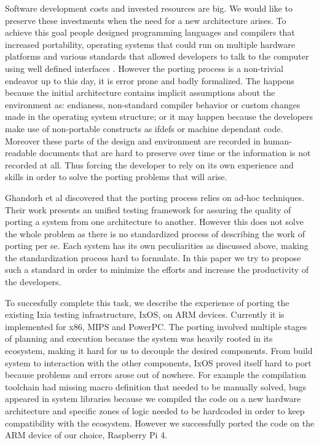 \documentclass[12pt,a4paper]{report}
\begin{document}
Software development costs and invested resources are big. We would like to preserve these
investments when the need for a new architecture arises. To achieve this goal people designed
programming languages and compilers that increased portability, operating systems that could run
on multiple hardware platforms \cite{johnson1978unix} and various standards that allowed developers
to talk to the computer using well defined interfaces \cite{walli1995posix}. However the porting
process is a non-trivial endeavor up to this day, it is error prone and badly formalized. The
happens because the initial architecture contains implicit assumptions about the environment as:
endianess, non-standard compiler behavior or custom changes made in the operating system structure;
or it may happen because the developers make use of non-portable constructs as ifdefs
\cite{spencer1992ifdef} or machine dependant code. Moreover these parts of the design and
environment are recorded in human-readable documents that are hard to preserve over time or the
information is not recorded at all. Thus forcing the developer to rely on its own experience and
skills in order to solve the porting problems that will arise.

Ghandorh et al \cite{ghandorh2020systematic} discovered that the porting process relies on ad-hoc
techniques. Their work presents an unified testing framework for assuring the quality of porting
a system from one architecture to another. However this does not solve the whole problem as there
is no standardized process of describing the work of porting per se. Each system has its own
peculiarities as discussed above, making the standardization process hard to formulate. In this
paper we try to propose such a standard in order to minimize the efforts and increase the
productivity of the developers.

To succesfully complete this task, we describe the experience of porting the existing Ixia testing
infrastructure, IxOS, on ARM devices. Currently it is implemented for x86, MIPS and PowerPC. The
porting involved multiple stages of planning and execution because the system was heavily rooted
in its ecosystem, making it hard for us to decouple the desired components. From build system to
interaction with the other components, IxOS proved itself hard to port because problems and errors
arose out of nowhere. For example the compilation toolchain had missing macro definition that needed
to be manually solved, bugs appeared in system libraries because we compiled the code on a new
hardware architecture and specific zones of logic needed to be hardcoded in order to keep
compatibility with the ecosystem. However we successfully ported the code on the ARM device of our
choice, Raspberry Pi 4.
\end{document}
